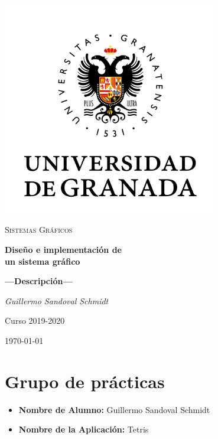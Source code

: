 \documentclass[11pt,a4paper]{article}
\begin{document}
\sloppy
\begin{titlepage}
  \centering
  \includegraphics[width=0.7\textwidth]{logo.png}\par\vspace{1cm}
  {\scshape\large Sistemas Gráficos \par} \vspace{1cm}
  {\huge\bfseries Diseño e implementación de \\ un sistema gráfico \par}
  \vspace{0.4cm}
  {\large\bfseries ---Descripción---\\}
  \vspace{0.6cm}
  {\large\itshape  Guillermo Sandoval Schmidt  \par} \vspace{1.00cm}
  Curso 2019-2020 \\
  \vfill

  {\large \today\par}
\end{titlepage}

\tableofcontents
\thispagestyle{empty}

\newpage

\section{Grupo de prácticas}
\begin{itemize}
    \item \textbf{Nombre de Alumno:} Guillermo Sandoval Schmidt
    \item \textbf{Nombre de la Aplicación:} Tetris
\end{itemize}
\end{document}
